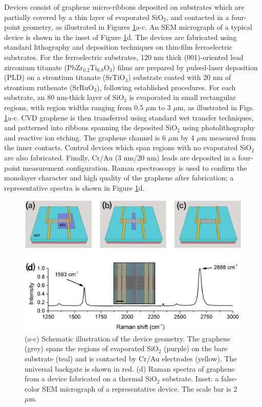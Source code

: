\documentclass[edeposit,fullpage,draftthesis]{uiucthesis2009}
\begin{document}
Devices consist of graphene micro-ribbons deposited on substrates which are partially covered by a thin layer of evaporated SiO$_2$, and contacted in a four-point geometry, as illustrated in Figures \ref{fig:devices}a-c. An SEM micrograph of a typical device is shown in the inset of Figure \ref{fig:devices}d. The devices are fabricated using standard lithography and deposition techniques on thin-film ferroelectric substrates. For the ferroelectric substrates, 120 nm thick (001)-oriented lead zirconium titanate (PbZr$_{0.2}$Ti$_{0.8}$O$_3$) films are prepared by pulsed-laser deposition (PLD) on a strontium titanate (SrTiO$_3$) substrate coated with 20 nm of strontium ruthenate (SrRuO$_3$), following established procedures\cite{Xu2014,Karthik2012}. For each substrate, an 80 nm-thick layer of SiO$_2$ is evaporated in small rectangular regions, with region widths ranging from 0.5 $\mu$m to 3 $\mu$m, as illustrated in Figs. \ref{fig:devices}a-c. CVD graphene is then transferred using standard wet transfer techniques\cite{Li2009}, and patterned into ribbons spanning the deposited SiO$_2$ using photolithography and reactive ion etching. The graphene channel is 6 $\mu$m by 4 $\mu$m measured from the inner contacts. Control devices which span regions with no evaporated SiO$_2$ are also fabricated. Finally, Cr/Au (3 nm/20 nm) leads are deposited in a four-point measurement configuration.  Raman spectroscopy is used to confirm the monolayer character and high quality of the graphene after fabrication; a representative spectra is shown in Figure \ref{fig:devices}d.

\begin{figure}
  \centering
  \includegraphics[width=.8\textwidth]{images/resultsanddiscussion/pztpaper/figure1}
  \caption[Schematic illustration of graphene-ferroelectric pn junction device geometry]{
   (a-c) Schematic illustration of the device geometry. The graphene (grey) spans the regions of evaporated SiO$_2$ (purple) on the bare substrate (teal) and is contacted by Cr/Au electrodes (yellow). The universal backgate is shown in red.
   (d) Raman spectra of graphene from a device fabricated on a thermal SiO$_2$ substrate. %
   Inset: a false-color SEM micrograph of a representative device. The scale bar is 2 $\mu$m.
  }
  \label{fig:devices}
\end{figure}
\end{document}
